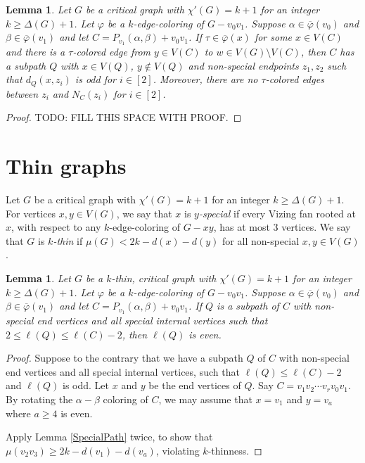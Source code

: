 \documentclass[12pt]{amsart}
\theoremstyle{plain}
\newtheorem{lem}[thm]{Lemma}
\theoremstyle{definition}
\theoremstyle{remark}
\newcommand{\irange}[1]{\left[#1\right]}
\newcommand{\vph}{\varphi}
\newcommand{\vphn}{\overline{\varphi}}
\begin{document}
\begin{lem}\label{TauEscape}
Let $G$ be a critical graph with $\chi'(G) = k+1$ for an integer $k \ge \Delta(G) + 1$.
Let $\vph$ be a $k$-edge-coloring of $G-v_0v_1$. Suppose $\alpha \in \vphn(v_0)$ and $\beta \in \vphn(v_1)$ and let $C = P_{v_1}(\alpha, \beta) + v_0v_1$.
If $\tau \in \vphn(x)$ for some $x \in V(C)$ and there is a $\tau$-colored edge from $y \in V(C)$ to $w \in V(G) \setminus V(C)$, then $C$ has a 
subpath $Q$ with $x \in V(Q)$, $y \not \in V(Q)$ and non-special endpoints $z_1,z_2$ such that $d_Q(x, z_i)$ is odd for $i \in \irange{2}$.  
Moreover, there are no $\tau$-colored edges between $z_i$ and $N_C(z_i)$ for $i \in \irange{2}$.
\end{lem}
\begin{proof}
TODO: FILL THIS SPACE WITH PROOF.
\end{proof}

\section{Thin graphs}
Let $G$ be a critical graph with $\chi'(G) = k+1$ for an integer $k \ge \Delta(G) + 1$.
For vertices $x,y \in V(G)$, we say that $x$ is \emph{$y$-special} if every Vizing fan rooted at $x$, with respect to any $k$-edge-coloring of $G-xy$, has at most 3 vertices.
We say that $G$ is \emph{$k$-thin} if $\mu(G) < 2k - d(x) - d(y)$ for all non-special $x,y \in V(G)$.

\begin{lem}\label{NonSpecialsInThinAreAtEvenDistance}
Let $G$ be a $k$-thin, critical graph with $\chi'(G) = k+1$ for an integer $k \ge \Delta(G) + 1$.
Let $\vph$ be a $k$-edge-coloring of $G-v_0v_1$. Suppose $\alpha \in \vphn(v_0)$ and $\beta \in \vphn(v_1)$ and let $C = P_{v_1}(\alpha, \beta) + v_0v_1$.
If $Q$ is a subpath of $C$ with non-special end vertices and all special internal vertices such that $2 \le \ell(Q) \le \ell(C) - 2$, then $\ell(Q)$ is even.
\end{lem}
\begin{proof}
Suppose to the contrary that we have a subpath $Q$ of $C$ with non-special end vertices and all special internal vertices, such that $\ell(Q) \le \ell(C) - 2$ and $\ell(Q)$ is odd.  Let $x$ and $y$ be the end vertices of $Q$.
Say $C = v_1v_2\cdots v_rv_0v_1$.  By rotating the $\alpha-\beta$ coloring of $C$, we may assume that $x = v_1$ and $y = v_a$ where $a \ge 4$ is even.

Apply Lemma \ref{SpecialPath} twice, to show that $\mu(v_2v_3) \ge 2k - d(v_1) - d(v_a)$, violating $k$-thinness.
\end{proof}
\end{document}
